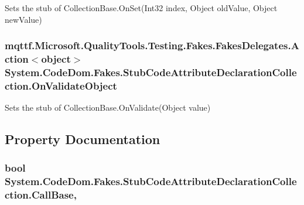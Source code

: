 Sets the stub of Collection\-Base.\-On\-Set(\-Int32 index, Object old\-Value, Object new\-Value)

\hypertarget{class_system_1_1_code_dom_1_1_fakes_1_1_stub_code_attribute_declaration_collection_a24629fb2591555d3e28b3f69a196a08c}{
\subsubsection[{On\-Validate\-Object}]{\setlength{\rightskip}{0pt plus 5cm}mqttf.\-Microsoft.\-Quality\-Tools.\-Testing.\-Fakes.\-Fakes\-Delegates.\-Action$<$object$>$ System.\-Code\-Dom.\-Fakes.\-Stub\-Code\-Attribute\-Declaration\-Collection.\-On\-Validate\-Object}}\label{class_system_1_1_code_dom_1_1_fakes_1_1_stub_code_attribute_declaration_collection_a24629fb2591555d3e28b3f69a196a08c}


Sets the stub of Collection\-Base.\-On\-Validate(\-Object value)



\subsection{Property Documentation}
\hypertarget{class_system_1_1_code_dom_1_1_fakes_1_1_stub_code_attribute_declaration_collection_a0d1cc9e5431eb003cd611ebcda991212}{
\subsubsection[{Call\-Base}]{\setlength{\rightskip}{0pt plus 5cm}bool System.\-Code\-Dom.\-Fakes.\-Stub\-Code\-Attribute\-Declaration\-Collection.\-Call\-Base\hspace{0.3cm}{\ttfamily [get]}, {\ttfamily [set]}}}\label{class_system_1_1_code_dom_1_1_fakes_1_1_stub_code_attribute_declaration_collection_a0d1cc9e5431eb003cd611ebcda991212}


